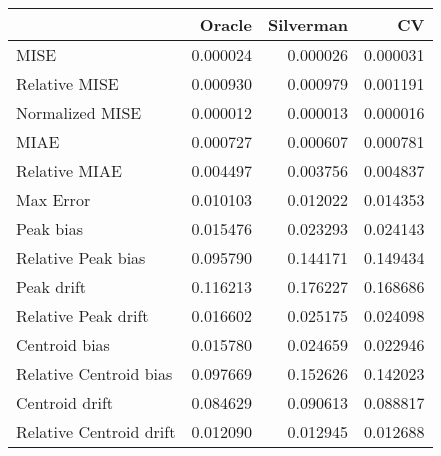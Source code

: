 \begin{tabular}{lrrr}
  \hline
 & Oracle & Silverman & CV \\ 
  \hline
MISE & 0.000024 & 0.000026 & 0.000031 \\ 
  Relative MISE & 0.000930 & 0.000979 & 0.001191 \\ 
  Normalized MISE & 0.000012 & 0.000013 & 0.000016 \\ 
  MIAE & 0.000727 & 0.000607 & 0.000781 \\ 
  Relative MIAE & 0.004497 & 0.003756 & 0.004837 \\ 
  Max Error & 0.010103 & 0.012022 & 0.014353 \\ 
  Peak bias & 0.015476 & 0.023293 & 0.024143 \\ 
  Relative Peak bias & 0.095790 & 0.144171 & 0.149434 \\ 
  Peak drift & 0.116213 & 0.176227 & 0.168686 \\ 
  Relative Peak drift & 0.016602 & 0.025175 & 0.024098 \\ 
  Centroid bias & 0.015780 & 0.024659 & 0.022946 \\ 
  Relative Centroid bias & 0.097669 & 0.152626 & 0.142023 \\ 
  Centroid drift & 0.084629 & 0.090613 & 0.088817 \\ 
  Relative Centroid drift & 0.012090 & 0.012945 & 0.012688 \\ 
   \hline
\end{tabular}
